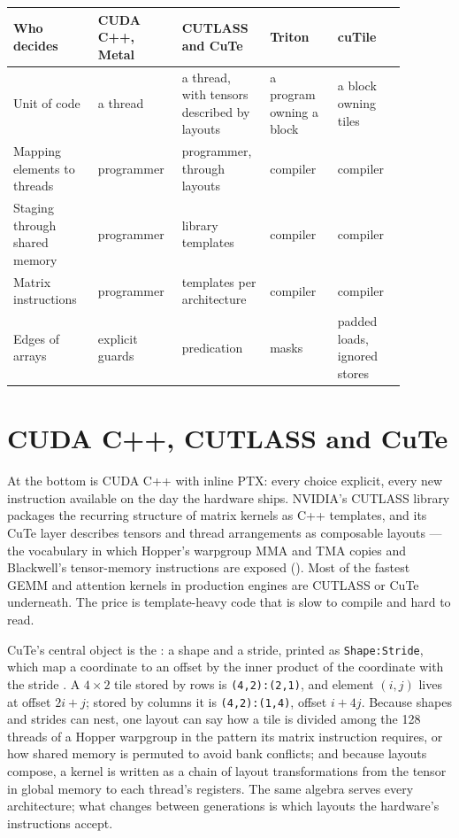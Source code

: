 \begin{center}\small
\begin{tabular}{@{}>{\raggedright\arraybackslash}p{0.2\linewidth}>{\raggedright\arraybackslash}p{0.17\linewidth}>{\raggedright\arraybackslash}p{0.19\linewidth}>{\raggedright\arraybackslash}p{0.16\linewidth}>{\raggedright\arraybackslash}p{0.16\linewidth}@{}}
\toprule
Who decides & CUDA C++, Metal & CUTLASS and CuTe & Triton & cuTile \\
\midrule
Unit of code & a thread & a thread, with tensors described by layouts & a program owning a block & a block owning tiles \\
Mapping elements to threads & programmer & programmer, through layouts & compiler & compiler \\
Staging through shared memory & programmer & library templates & compiler & compiler \\
Matrix instructions & programmer & templates per architecture & compiler & compiler \\
Edges of arrays & explicit guards & predication & masks & padded loads, ignored stores \\
\bottomrule
\end{tabular}
\end{center}

\section{CUDA C++, CUTLASS and CuTe}

At the bottom is CUDA C++ with inline PTX: every choice explicit, every new
instruction available on the day the hardware ships. NVIDIA's CUTLASS library
packages the recurring structure of matrix kernels as C++ templates, and its
CuTe layer describes tensors and thread arrangements as composable layouts ---
the vocabulary in which Hopper's warpgroup MMA and TMA copies and Blackwell's
tensor-memory instructions are exposed (). Most of the
fastest GEMM and attention kernels in production engines are CUTLASS or
CuTe underneath. The price is template-heavy code that is slow to compile and
hard to read.

CuTe's central object is the : a shape and a stride, printed as
\texttt{Shape:Stride}, which map a coordinate to an offset by the inner product
of the coordinate with the stride \cite{nvidia2026cutelayout}. A $4\times2$
tile stored by rows is \texttt{(4,2):(2,1)}, and element $(i, j)$ lives at
offset $2i + j$; stored by columns it is \texttt{(4,2):(1,4)}, offset $i + 4j$.
Because shapes and strides can nest, one layout can say how a tile is divided
among the 128 threads of a Hopper warpgroup in the pattern its matrix
instruction requires, or how shared memory is permuted to avoid bank
conflicts; and because layouts compose, a kernel is written as a chain of
layout transformations from the tensor in global memory to each thread's
registers. The same algebra serves every architecture; what changes between
generations is which layouts the hardware's instructions accept.

